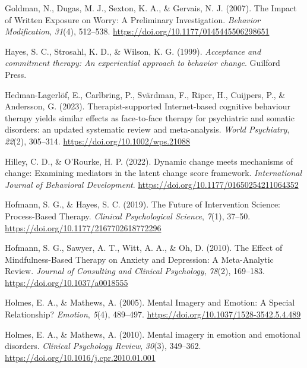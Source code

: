 \documentclass[
  man,floatsintext]{apa7}
\newlength{\cslhangindent}
\newlength{\cslentryspacingunit} %
\newenvironment{CSLReferences}[2] %
 {%
  \setlength{\parindent}{0pt}
  \ifodd #1
  \let\oldpar\par
  \def\par{\hangindent=\cslhangindent\oldpar}
  \fi
  \setlength{\parskip}{#2\cslentryspacingunit}
 }%
 {}
\begin{document}
\begin{CSLReferences}{1}{0}
\leavevmode{}%
Goldman, N., Dugas, M. J., Sexton, K. A., \& Gervais, N. J. (2007). The Impact of Written Exposure on Worry: A Preliminary Investigation. \emph{Behavior Modification}, \emph{31}(4), 512--538. \url{https://doi.org/10.1177/0145445506298651}

\leavevmode{}%
Hayes, S. C., Strosahl, K. D., \& Wilson, K. G. (1999). \emph{Acceptance and commitment therapy: An experiential approach to behavior change}. Guilford Press.

\leavevmode{}%
Hedman-Lagerlöf, E., Carlbring, P., Svärdman, F., Riper, H., Cuijpers, P., \& Andersson, G. (2023). Therapist-supported Internet-based cognitive behaviour therapy yields similar effects as face-to-face therapy for psychiatric and somatic disorders: an updated systematic review and meta-analysis. \emph{World Psychiatry}, \emph{22}(2), 305--314. \url{https://doi.org/10.1002/wps.21088}

\leavevmode{}%
Hilley, C. D., \& O'Rourke, H. P. (2022). Dynamic change meets mechanisms of change: Examining mediators in the latent change score framework. \emph{International Journal of Behavioral Development}. \url{https://doi.org/10.1177/01650254211064352}

\leavevmode{}%
Hofmann, S. G., \& Hayes, S. C. (2019). The Future of Intervention Science: Process-Based Therapy. \emph{Clinical Psychological Science}, \emph{7}(1), 37--50. \url{https://doi.org/10.1177/2167702618772296}

\leavevmode{}%
Hofmann, S. G., Sawyer, A. T., Witt, A. A., \& Oh, D. (2010). The Effect of Mindfulness-Based Therapy on Anxiety and Depression: A Meta-Analytic Review. \emph{Journal of Consulting and Clinical Psychology}, \emph{78}(2), 169--183. \url{https://doi.org/10.1037/a0018555}

\leavevmode{}%
Holmes, E. A., \& Mathews, A. (2005). Mental Imagery and Emotion: A Special Relationship? \emph{Emotion}, \emph{5}(4), 489--497. \url{https://doi.org/10.1037/1528-3542.5.4.489}

\leavevmode{}%
Holmes, E. A., \& Mathews, A. (2010). Mental imagery in emotion and emotional disorders. \emph{Clinical Psychology Review}, \emph{30}(3), 349--362. \url{https://doi.org/10.1016/j.cpr.2010.01.001}


\end{CSLReferences}
\end{document}
